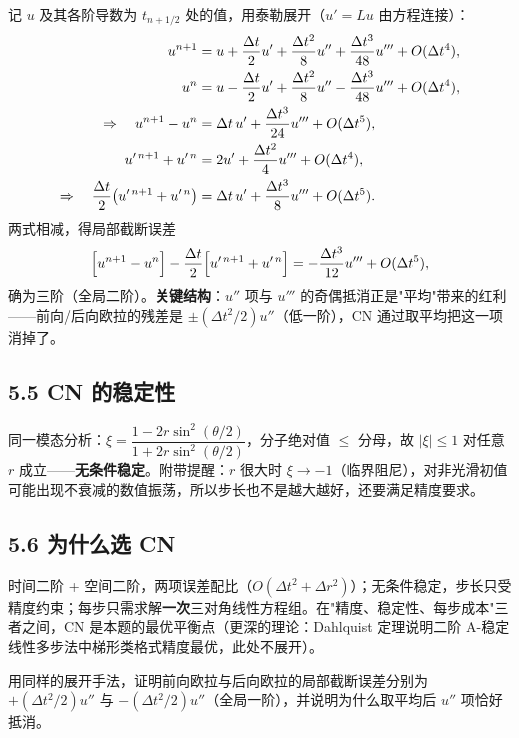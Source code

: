 \documentclass[12pt,a4paper]{ctexart}
\newcommand{\handon}[1]{\par\smallskip\noindent{\heiti 【手推练习】}#1\par\smallskip}
\begin{document}
记 $u$ 及其各阶导数为 $t_{n+1/2}$ 处的值，用泰勒展开（$u'=Lu$ 由方程连接）：
\begin{align}
u^{n+1}&=u+\frac{\Delta t}{2}u'+\frac{\Delta t^2}{8}u''+\frac{\Delta t^3}{48}u'''+O(\Delta t^4),\notag\\
u^{n}&=u-\frac{\Delta t}{2}u'+\frac{\Delta t^2}{8}u''-\frac{\Delta t^3}{48}u'''+O(\Delta t^4),\notag\\
\Rightarrow\quad u^{n+1}-u^n&=\Delta t\,u'+\frac{\Delta t^3}{24}u'''+O(\Delta t^5),\notag\\
u'^{\,n+1}+u'^{\,n}&=2u'+\frac{\Delta t^2}{4}u'''+O(\Delta t^4),\notag\\
\Rightarrow\quad \frac{\Delta t}{2}\bigl(u'^{\,n+1}+u'^{\,n}\bigr)&=\Delta t\,u'+\frac{\Delta t^3}{8}u'''+O(\Delta t^5).\notag
\end{align}
两式相减，得局部截断误差
\begin{equation}
\Bigl[u^{n+1}-u^{n}\Bigr]-\frac{\Delta t}{2}\Bigl[u'^{\,n+1}+u'^{\,n}\Bigr]
=-\frac{\Delta t^3}{12}u'''+O(\Delta t^5),
\end{equation}
确为三阶（全局二阶）。\textbf{关键结构}：$u''$ 项与 $u'''$ 的奇偶抵消正是"平均"带来的红利——前向/后向欧拉的残差是 $\pm(\Delta t^2/2)u''$（低一阶），CN 通过取平均把这一项消掉了。

\subsection{5.5 CN 的稳定性}

同一模态分析：$\xi=\dfrac{1-2r\sin^2(\theta/2)}{1+2r\sin^2(\theta/2)}$，分子绝对值 $\le$ 分母，故 $|\xi|\le1$ 对任意 $r$ 成立——\textbf{无条件稳定}。附带提醒：$r$ 很大时 $\xi\to-1$（临界阻尼），对非光滑初值可能出现不衰减的数值振荡，所以步长也不是越大越好，还要满足精度要求。

\subsection{5.6 为什么选 CN}

时间二阶 + 空间二阶，两项误差配比（$O(\Delta t^2+\Delta r^2)$）；无条件稳定，步长只受精度约束；每步只需求解\textbf{一次}三对角线性方程组。在"精度、稳定性、每步成本"三者之间，CN 是本题的最优平衡点（更深的理论：Dahlquist 定理说明二阶 A-稳定线性多步法中梯形类格式精度最优，此处不展开）。

\handon{用同样的展开手法，证明前向欧拉与后向欧拉的局部截断误差分别为 $+(\Delta t^2/2)u''$ 与 $-(\Delta t^2/2)u''$（全局一阶），并说明为什么取平均后 $u''$ 项恰好抵消。}
\end{document}
